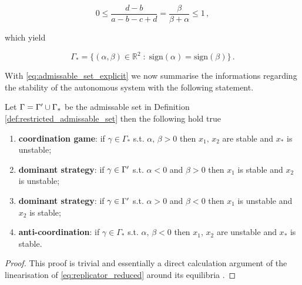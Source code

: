 \documentclass[../main.tex]{subfiles}
\begin{document}
\begin{equation*}
     0 \leq \frac{d-b}{a -b -c + d} = \frac{\beta}{\beta + \alpha} \leq 1\,,
\end{equation*}

which yield

\begin{equation}\label{eq:admissable_set_explicit}
        \Gamma_{*} = \{(\alpha,\beta)\in \mathbb{R}^{2}\;:\; \text{sign}(\alpha)=\text{sign}(\beta)\}\,.
\end{equation}

With \eqref{eq:admissable_set_explicit} we now summarise the informations regarding the stability of the autonomous system with the following statement.

\begin{lemma}\label{lemma:stability}
     Let $\Gamma=\Gamma'\cup\Gamma_{*}$ be the admissable set in Definition \ref{def:restricted_admissable_set} then the following hold true
     \begin{enumerate}
          \item \textbf{coordination game}: if $\gamma\in\Gamma_{*}$ s.t. $\alpha,\,\beta>0$ then $x_{1},\,x_{2}$ are stable and $x_{*}$ is unstable;
          \item \textbf{dominant strategy}: if $\gamma\in\Gamma'$ s.t. $\alpha<0$ and $\beta>0$ then $x_{1}$ is stable and $x_{2}$ is unstable;
          \item \textbf{dominant strategy}: if $\gamma\in\Gamma'$ s.t. $\alpha>0$ and $\beta<0$ then $x_{1}$ is unstable and $x_{2}$ is stable;
          \item \textbf{anti-coordination}: if $\gamma\in\Gamma_{*}$ s.t. $\alpha,\,\beta<0$ then $x_{1},\,x_{2}$ are unstable and $x_{*}$ is stable.
     \end{enumerate}
\end{lemma}

\begin{proof}
        This proof is trivial and essentially a direct calculation argument of the linearisation of \eqref{eq:replicator_reduced} around its equilibria \cite[Appendix A, p. 15]{Zino25}.
\end{proof}
\end{document}
